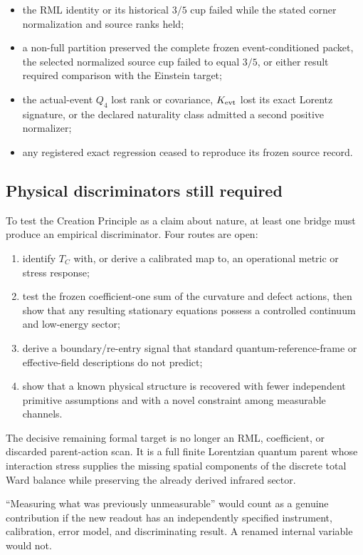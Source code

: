 \begin{itemize}
\item the RML identity or its historical $3/5$ cup failed while the stated corner normalization and source ranks held;
\item a non-full partition preserved the complete frozen event-conditioned packet, the selected normalized source cup failed to equal $3/5$, or either result required comparison with the Einstein target;
\item the actual-event $Q_4$ lost rank or covariance, $K_{\rm evt}$ lost its exact Lorentz signature, or the declared naturality class admitted a second positive normalizer;
\item any registered exact regression ceased to reproduce its frozen source record.
\end{itemize}

\subsection{Physical discriminators still required}

To test the Creation Principle as a claim about nature, at least one bridge must produce an empirical discriminator. Four routes are open:
\begin{enumerate}
\item identify $T_C$ with, or derive a calibrated map to, an operational metric or stress response;
\item test the frozen coefficient-one sum of the curvature and defect actions, then show that any resulting stationary equations possess a controlled continuum and low-energy sector;
\item derive a boundary/re-entry signal that standard quantum-reference-frame or effective-field descriptions do not predict;
\item show that a known physical structure is recovered with fewer independent primitive assumptions and with a novel constraint among measurable channels.
\end{enumerate}

The decisive remaining formal target is no longer an RML, coefficient, or discarded parent-action scan. It is a full finite Lorentzian quantum parent whose interaction stress supplies the missing spatial components of the discrete total Ward balance while preserving the already derived infrared sector.

``Measuring what was previously unmeasurable'' would count as a genuine contribution if the new readout has an independently specified instrument, calibration, error model, and discriminating result. A renamed internal variable would not.

